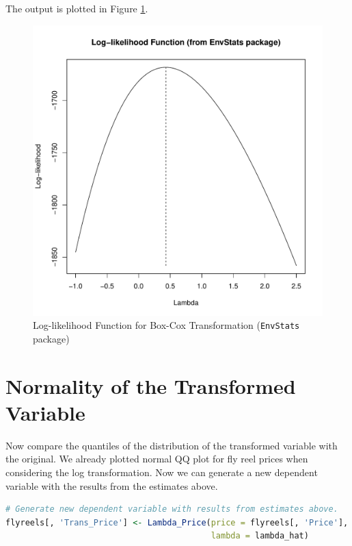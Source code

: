 The output is plotted in Figure \ref{fig:plot_like_EnvStats}.

\begin{figure}[h!]
  \centering
  \includegraphics[scale = 0.5, keepaspectratio=true]{../Figures/plot_like_EnvStats}
  \caption{Log-likelihood Function for Box-Cox Transformation (\texttt{EnvStats} package)} \label{fig:plot_like_EnvStats}
\end{figure}






\clearpage
\section{Normality of the Transformed Variable}

Now compare the quantiles of the distribution of the transformed variable with 
the original. 
We already plotted normal QQ plot for fly reel prices when considering the log transformation.
Now we can generate a new dependent variable with the results from the estimates above.


\begin{lstlisting}[language=R]
# Generate new dependent variable with results from estimates above.
flyreels[, 'Trans_Price'] <- Lambda_Price(price = flyreels[, 'Price'],
                                          lambda = lambda_hat)
\end{lstlisting}

